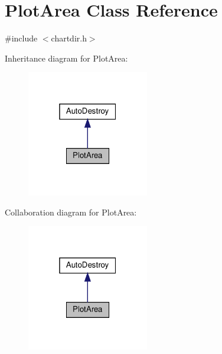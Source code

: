 \hypertarget{class_plot_area}{}\section{Plot\+Area Class Reference}
\label{class_plot_area}


{\ttfamily \#include $<$chartdir.\+h$>$}



Inheritance diagram for Plot\+Area\+:
\nopagebreak
\begin{figure}[H]
\begin{center}
\leavevmode
\includegraphics[width=151pt]{class_plot_area__inherit__graph}
\end{center}
\end{figure}


Collaboration diagram for Plot\+Area\+:
\nopagebreak
\begin{figure}[H]
\begin{center}
\leavevmode
\includegraphics[width=151pt]{class_plot_area__coll__graph}
\end{center}
\end{figure}
